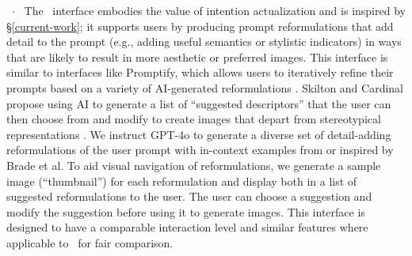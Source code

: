 
\textbf{}~$\cdot$~
The ~interface embodies the value of intention actualization and is inspired by \S\ref{current-work}; it supports users by producing prompt reformulations that add detail to the prompt (e.g., adding useful semantics or stylistic indicators) in ways that are likely to result in more aesthetic or preferred images.
This interface is similar to interfaces like Promptify, which allows users to iteratively refine their prompts based on a variety of AI-generated reformulations \cite{brade2023promptify}.
Skilton and Cardinal propose using AI to generate a list of ``suggested descriptors'' that the user can then choose from and modify to create images that depart from stereotypical representations \cite{skiltonandcardinal2024inclusivepromptengineering}. 
We instruct GPT-4o to generate a diverse set of detail-adding reformulations of the user prompt with in-context examples from or inspired by Brade et al. 
To aid visual navigation of reformulations, we generate a sample image (``thumbnail'') for each reformulation and display both in a list of suggested reformulations to the user.
The user can choose a suggestion and modify the suggestion before using it to generate images.
This interface is designed to have a comparable interaction level and similar features where applicable to \agonistic~for fair comparison.

